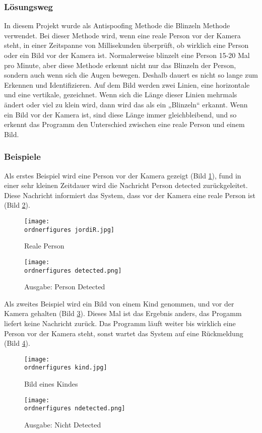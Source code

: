 \subsubsection{Lösungsweg}
In diesem Projekt wurde als Antispoofing Methode die Blinzeln Methode verwendet. Bei dieser Methode wird, wenn eine reale Person vor der Kamera steht, in einer Zeitspanne von Millisekunden überprüft, ob wirklich eine Person oder ein Bild vor der Kamera ist. Normalerweise blinzelt eine Person 15-20 Mal pro Minute, aber diese Methode erkennt nicht nur das Blinzeln der Person, sondern auch wenn sich die Augen bewegen. Deshalb dauert es nicht so lange zum Erkennen und Identifizieren.
Auf dem Bild werden zwei Linien, eine horizontale und eine vertikale, gezeichnet. Wenn sich die Länge dieser Linien mehrmals ändert oder viel zu klein wird, dann wird das als ein „Blinzeln“ erkannt. Wenn ein Bild vor der Kamera ist, sind diese Länge immer gleichbleibend, und so erkennt das Programm den Unterschied zwischen eine reale Person und einem Bild.
\newpage
\subsubsection{Beispiele}
Als erstes Beispiel wird eine Person vor der Kamera gezeigt (Bild \ref{fig:realep}),  fund in einer sehr kleinen Zeitdauer wird die Nachricht Person detected zurückgeleitet. Diese Nachricht informiert das System, dass vor der Kamera eine reale Person ist  (Bild \ref{fig:ausgabep}).\\
\begin{figure}[ht]
  \centering
    \texttt{[image: \\ordnerfigures jordiR.jpg]}
      \caption{Reale Person}
      \label{fig:realep}
\end{figure}
\begin{figure}[ht]
  \centering
    \texttt{[image: \\ordnerfigures detected.png]}
      \caption{Ausgabe: Person Detected}
      \label{fig:ausgabep}
\end{figure}

\newpage
Als zweites Beispiel wird ein Bild  von einem Kind genommen, und vor der Kamera gehalten (Bild \ref{fig:kindb}). Dieses Mal ist das Ergebnis anders, das Progamm liefert keine Nachricht zurück. Das Programm läuft weiter bis wirklich eine Person vor der Kamera steht, sonst wartet das System auf eine Rückmeldung (Bild \ref{fig:ausgabeb}).
\begin{figure}[ht]
  \centering
    \texttt{[image: \\ordnerfigures kind.jpg]}
      \caption{Bild eines Kindes}
      \label{fig:kindb}
\end{figure}
\begin{figure}[ht]
  \centering
    \texttt{[image: \\ordnerfigures ndetected.png]}
      \caption{Ausgabe: Nicht Detected}
      \label{fig:ausgabeb}
\end{figure}
